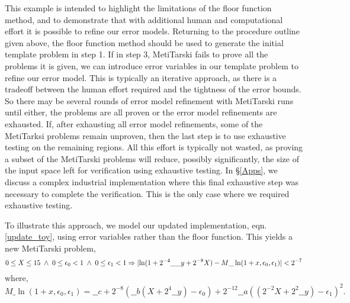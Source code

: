\documentclass{fac}
\newcommand{\abs}[1]{\lvert#1\rvert}
\begin{document}
This example is intended to highlight the limitations of the floor function method, and to demonstrate that with additional human and computational effort it is possible to refine our error models. Returning to the procedure outline given above, the floor function method should be used to generate the initial template problem in step 1. If in step 3, MetiTarski fails to prove all the problems it is given, we can introduce error variables in our template problem to refine our error model. This is typically an iterative approach, as there is a tradeoff between the human effort required and the tightness of the error bounds. So there may be several rounds of error model refinement with MetiTarski runs until either, the problems are all proven or the error model refinements are exhausted. If, after exhausting all error model refinements, some of the MetiTarksi problems remain unproven, then the last step is to use exhaustive testing on the remaining regions. All this effort is typically not wasted, as proving a subset of the MetiTarski problems will reduce, possibly significantly, the size of the input space left for verification using exhaustive testing. In \S \ref{Apps}, we discuss a complex industrial implementation where this final exhaustive step was necessary to complete the verification. This is the only case where we required exhaustive testing.

To illustrate this approach, we model our updated implementation, eqn. \ref{update_toy}, using error variables rather than the floor function. This yields a new MetiTarski problem,
\[
	0\le X \le 15 \hspace{0.1cm} \land \hspace{0.1cm} 0\le \epsilon_0<1\hspace{0.1cm} \land \hspace{0.1cm} 0\le \epsilon_1<1
	\Rightarrow \abs{\ln(1+2^{-4}\_\_y+2^{-8}X) - M\_\ln(1+x,\epsilon_0,\epsilon_1)} < 2^{-7}
\]
where, 
\[
M\_\ln(1+x,\epsilon_0,\epsilon_1)=\_\_c+2^{-8}(\_\_b(X+2^{4}\_\_y)-\epsilon_0)+2^{-12}\_\_a((2^{-2}X+2^{2}\_\_y)-\epsilon_1)^2.
\]
\end{document}
